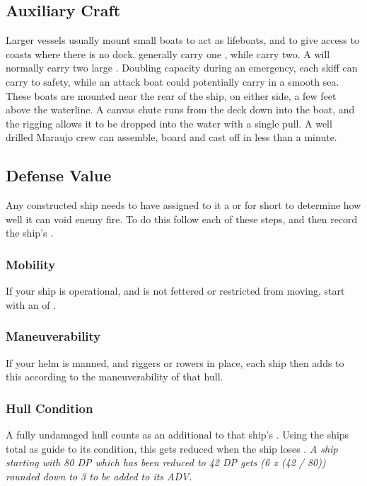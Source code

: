 \begin{multicols*}{2}
\subsection{Auxiliary Craft}
Larger vessels usually mount small boats to act as lifeboats, and to give access to coasts where there is no dock.  generally carry one , while  carry two. A  will normally carry two large . Doubling capacity during an emergency, each skiff can carry  to safety, while an attack boat could potentially carry  in a smooth sea. These boats are mounted near the rear of the ship, on either side, a few feet above the waterline. A canvas chute runs from the deck down into the boat, and the rigging allows it to be dropped into the water with a single pull. A well drilled Maraujo crew can assemble, board and cast off in less than a minute.
\subsection{Defense Value}
Any constructed ship needs to have assigned to it a  or \ADV for short to determine how well it can void enemy fire. To do this follow each of these steps, and then record the ship's \ADV.
\subsubsection{Mobility}
If your ship is operational, and is not fettered or restricted from moving, start with an \ADV of .
\subsubsection{Maneuverability}
If your helm is manned, and riggers or rowers in place, each ship then adds to this \ADV according to the maneuverability of that hull.\\
\begin{normboxc}

\end{normboxc}

\subsubsection{Hull Condition}
A fully undamaged hull counts as an additional  to that ship's \ADV. Using the ships \DP total as guide to its condition, this gets reduced when the ship loses \DP. \textit{A ship starting with 80 DP which has been reduced to 42 DP gets (6 x (42 / 80)) rounded down to 3 to be added to its ADV.}

\end{multicols*}
